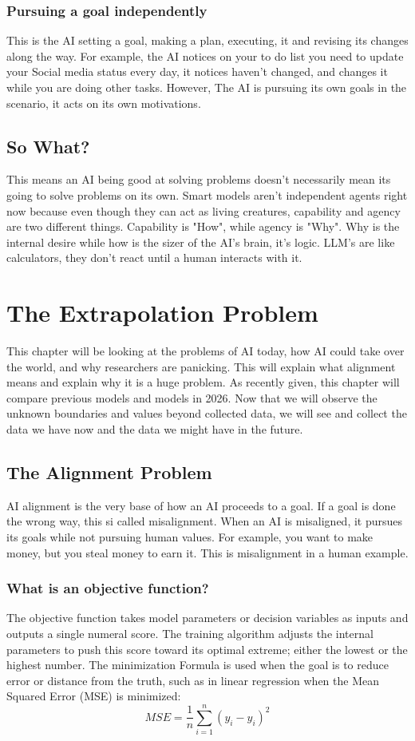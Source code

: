\documentclass{report}
\begin{document}
	\subsection{Pursuing a goal independently}
	This is the AI setting a goal, making a plan, executing, it and revising its changes along the way. For example, the AI notices on your to do list you need to update your Social media status every day, it notices haven't changed, and changes it while you are doing other tasks. However, The AI is pursuing its own goals in the scenario, it acts on its own motivations.
	
	\section{So What?}
	This means an AI being good at solving problems doesn't necessarily mean its going to solve problems on its own. Smart models aren't independent agents right now because even though they can act as living creatures, capability and agency are two different things. Capability is "How", while agency is "Why". Why is the internal desire while how is the sizer of the AI's brain, it's logic. LLM's are like calculators, they don't react until a human interacts with it. 
	
	\chapter{The Extrapolation Problem}
	This chapter will be looking at the problems of AI today, how AI could take over the world, and why researchers are panicking. This will explain what alignment means and explain why it is a huge problem. As recently given, this chapter will compare previous models and models in 2026. Now that we will observe the unknown boundaries and values beyond collected data, we will see and collect the data we have now and the data we might have in the future.
	
	\section{The Alignment Problem}
	AI alignment is the very base of how an AI proceeds to a goal. If a goal is done the wrong way, this si called misalignment. When an AI is misaligned, it pursues its goals while not pursuing human values. For example, you want to make money, but you steal money to earn it. This is misalignment in a human example. 
	
	\subsection{What is an objective function?}
	The objective function takes model parameters or decision variables as inputs and outputs a single numeral score. The training algorithm adjusts the internal parameters to push this score toward its optimal extreme; either the lowest or the highest number.
	The minimization Formula is used when the goal is to reduce error or distance from the truth, such as in linear regression when the Mean Squared Error (MSE) is minimized: 
	$$MSE = \frac{1}{n} \sum_{i=1}^{n} (y_i - \hat{y}_i)^2$$
	
\end{document}
